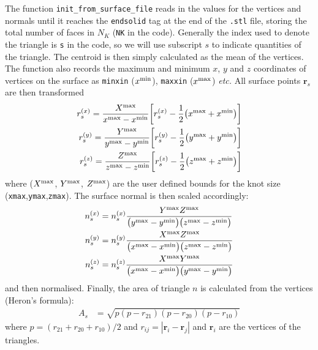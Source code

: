 \documentclass[notitlepage,aps,amsmath,amssymb,11pt]{revtex4-1}
\newcommand{\norm}[1]{\left| #1 \right|}
\renewcommand{\vec}[1]{\boldsymbol{#1}}
\begin{document}
The function \verb'init_from_surface_file' reads in the values for the vertices and normals until it reaches the \verb'endsolid' tag at the end of the \verb'.stl' file, storing the total number of faces in $N_K$ (\verb'NK' in the code). Generally the index used to denote the triangle is \verb's' in the code, so we will use subscript $s$ to indicate quantities of the triangle. The centroid is then simply calculated as the mean of the vertices. The function also records the maximum and minimum $x$, $y$ and $z$ coordinates of vertices on the surface as \verb'minxin' ($x^{\rm min}$), \verb'maxxin' ($x^{\rm max}$) \emph{etc.} All surface points $\vec{r}_s$ are then transformed
\begin{align}
\label{rxs} r^{(x)}_s = \frac{X^{\rm max}}{x^{\rm max} - x^{\rm min}}\biggl[r^{(x)}_s - \frac{1}{2}\bigl(x^{\rm max} + x^{\rm min}\bigr)\biggr] \\
\label{rys} r^{(y)}_s = \frac{Y^{\rm max}}{y^{\rm max} - y^{\rm min}}\biggl[r^{(y)}_s - \frac{1}{2}\bigl(y^{\rm max} + y^{\rm min}\bigr)\biggr]  \\
\label{rzs} r^{(z)}_s = \frac{Z^{\rm max}}{z^{\rm max} - z^{\rm min}}\biggl[r^{(z)}_s - \frac{1}{2}\bigl(z^{\rm max} + z^{\rm min}\bigr)\biggr] 
\end{align}
where ($X^{\rm max}$, $Y^{\rm max}$, $Z^{\rm max}$) are the user defined bounds for the knot size (\verb'xmax',\verb'ymax',\verb'zmax'). The surface normal is then scaled accordingly:
\begin{align}
n^{(x)}_s &= n^{(x)}_s\frac{Y^{\rm max} Z^{\rm max}}{\bigl(y^{\rm max} - y^{\rm min}\bigr)\bigl(z^{\rm max} - z^{\rm min}\bigr)}\\
n^{(y)}_s &= n^{(y)}_s\frac{X^{\rm max} Z^{\rm max}}{\bigl(x^{\rm max} - x^{\rm min}\bigr)\bigl(z^{\rm max} - z^{\rm min}\bigr)}\\
n^{(z)}_s &= n^{(z)}_s\frac{X^{\rm max} Y^{\rm max}}{\bigl(x^{\rm max} - x^{\rm min}\bigr)\bigl(y^{\rm max} - y^{\rm min}\bigr)}
\end{align}
and then normalised. Finally, the area of triangle $n$ is calculated from the vertices (Heron's formula):
\begin{align}
A_s &= \sqrt{p(p-r_{21})(p-r_{20})(p-r_{10})} 
\end{align}
where $p = (r_{21} + r_{20} + r_{10})/2$ and $r_{ij} = \norm{\vec{r}_i - \vec{r}_j}$ and $\vec{r}_i$ are the vertices of the triangles. 
\end{document}
